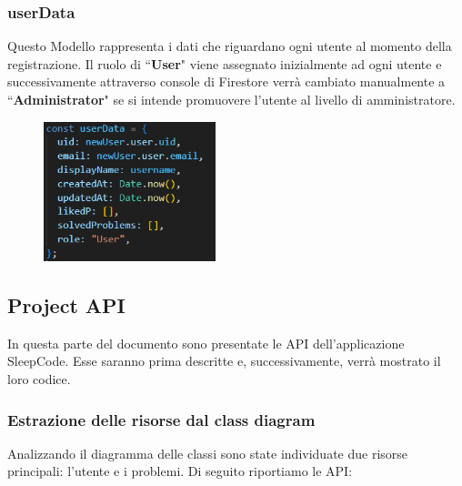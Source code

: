 \documentclass[11pt, a4paper]{article}
\theoremstyle{definition}
\begin{document}
\subsubsection*{userData}
Questo Modello rappresenta i dati che riguardano ogni utente al momento della registrazione. Il ruolo di ``\textbf{User}" viene assegnato inizialmente ad ogni utente e successivamente attraverso console di Firestore verrà cambiato manualmente a ``\textbf{Administrator}"
se si intende promuovere l'utente al livello di amministratore.

\begin{figure}[H]
  \centering
  \includegraphics[width=5cm]{materiale/User Template.png}
\end{figure}


\subsection{Project API}
In questa parte del documento sono presentate le API dell'applicazione SleepCode.
Esse saranno prima descritte e, successivamente, verrà mostrato il loro codice.

\subsubsection{Estrazione delle risorse dal class diagram}
Analizzando il diagramma delle classi sono state individuate due risorse principali: l'utente e i problemi. Di seguito riportiamo le API:
\end{document}
